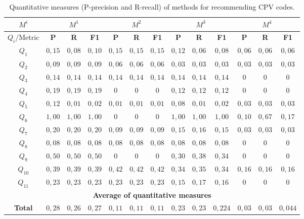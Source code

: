 \begin{table}[!htb]
\renewcommand{\arraystretch}{1.3}
\begin{center}
\scriptsize
\begin{tabular}{|c||c|c|c||c|c|c||c|c|c||c|c|c|}
\hline
 \textbf{$M^i$}&\multicolumn{3}{|c||}{$M^{1}$} & \multicolumn{3}{|c||}{$M^{2}$}& \multicolumn{3}{|c||}{$M^{3}$} & \multicolumn{3}{|c|}{$M^{4}$} \\ \hline
\textbf{$Q_i$}/Metric	  &\textbf{P} & \textbf{R} & \textbf{F1} & \textbf{P} & \textbf{R} & \textbf{F1} & \textbf{P} & \textbf{R} & \textbf{F1} & \textbf{P} & \textbf{R} & \textbf{F1}  \\ \hline \hline
$Q_1$  	  &$0,15$ & $0,08$ & $0,10$ &		$0,15$ & $0,15$ & $0,15$ &	$0,12$ & $0,06$ & $0,08$ &	$0,06$ & $0,06$ & $0,06$ \\ \hline
$Q_2$  	  &$0,09$ & $0,09$ & $0,09$ & 		$0,06$ & $0,06$ & $0,06$ & 	$0,03$ & $0,03$ & $0,03$ & 	$0,03$ & $0,03$ & $0,03$ \\ \hline
$Q_3$  	  &$0,14$ & $0,14$ & $0,14$ & 		$0,14$ & $0,14$ & $0,14$ & 	$0,14$ & $0,14$ & $0,14$ & 	$0$ & $0$ & $0$ \\ \hline
$Q_4$  	  &$0,19$ & $0,19$ & $0,19$ &		$0$ 	& $0$ & $0$ & 		$0,12$ & $0,12$ & $0,12$ & 	$0$ & $0$ & $0$ \\ \hline
$Q_5$  	  &$0,12$ & $0,01$ & $0,02$ & 		$0,01$ & $0,01$ & $0,01$ & 	$0,08$ & $0,01$ & $0,02$ & 	$0,03$ & $0,03$ & $0,03$ \\ \hline
$Q_6$  	  &$1,00$ & $1,00$ & $1,00$ & 		$0$ & $0$ & $0$ & 		$1,00$ & $1,00$ & $1,00$ & 	$0,10$ & $0,67$ & $0,17$ \\ \hline
$Q_7$  	  &$0,20$ & $0,20$ & $0,20$ & 		$0,09$ & $0,09$ & $0,09$ & 	$0,15$ & $0,16$ & $0,15$ & 	$0,03$ & $0,03$ & $0,03$ \\ \hline
$Q_8$  	  &$0,08$ & $0,08$ & $0,08$ & 		$0,08$ & $0,08$ & $0,08$ & 	$0,08$ & $0,08$ & $0,08$ & 	$0$ & $0$ & $0$ \\ \hline
$Q_9$  	  &$0,50$ & $0,50$ & $0,50$ & 		$0$ & $0$ & $0$ & 		$0,30$ & $0,38$ & $0,34$ & 	$0$ & $0$ & $0$ \\ \hline
$Q_{10}$  &$0,39$ & $0,39$ & $0,39$ & 		$0,42$ & $0,42$ & $0,42$ & 	$0,34$ & $0,35$ & $0,34$ & 	$0,16$ & $0,16$ & $0,16$ \\ \hline
$Q_{11}$  &$0,23$ & $0,23$ & $0,23$ & 		$0,23$ & $0,23$ & $0,23$ & 	$0,15$ & $0,17$ & $0,16$ & 	$0$ & $0$ & $0$ \\ \hline
\multicolumn{13}{|c|}{\textbf{Average of quantitative measures}} \\ \hline
\textbf{Total}  &$0,28$ & $0,26$ & $0,27$ & 	$0,11$ & $0,11$ & $0,11$ &  	$0,23$ & $0,23$ & $0,224$ &  	$0,03$ & $0,03$ & $0,044$ \\ \hline
\hline
 \end{tabular}
\caption{Quantitative measures (P-precision and R-recall) of methods for recommending CPV codes.}\label{table:queries-ir-results}
  \end{center}
\end{table} 

